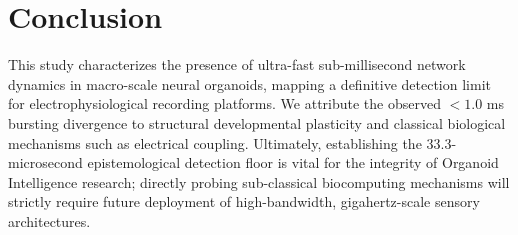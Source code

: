 \documentclass[12pt]{article}
\begin{document}
\section{Conclusion}
This study characterizes the presence of ultra-fast sub-millisecond network dynamics in macro-scale neural organoids, mapping a definitive detection limit for electrophysiological recording platforms. We attribute the observed $< 1.0$ ms bursting divergence to structural developmental plasticity and classical biological mechanisms such as electrical coupling. Ultimately, establishing the 33.3-microsecond epistemological detection floor is vital for the integrity of Organoid Intelligence research; directly probing sub-classical biocomputing mechanisms will strictly require future deployment of high-bandwidth, gigahertz-scale sensory architectures.
\end{document}
